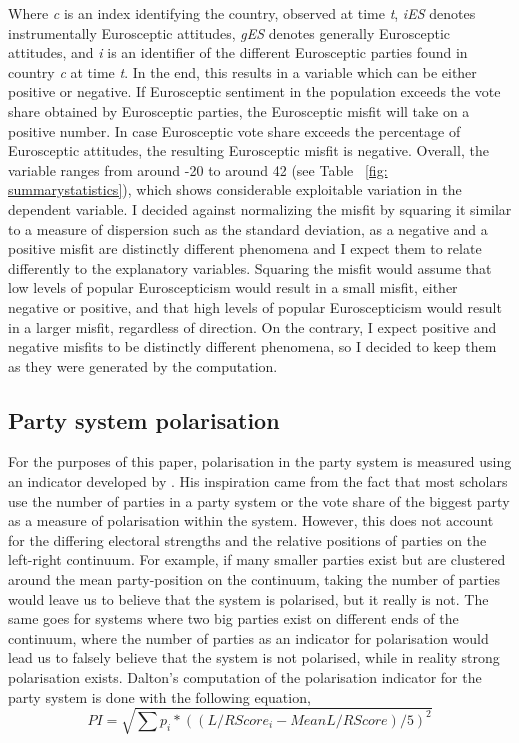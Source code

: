 Where \emph{c} is an index identifying the country, observed at time \emph{t}, \emph{iES} denotes instrumentally Eurosceptic attitudes, \emph{gES} denotes generally Eurosceptic attitudes, and \emph{i} is an identifier of the different Eurosceptic parties found in country \emph{c} at time \emph{t}. In the end, this results in a variable which can be either positive or negative. If Eurosceptic sentiment in the population exceeds the vote share obtained by Eurosceptic parties, the Eurosceptic misfit will take on a positive number. In case Eurosceptic vote share exceeds the percentage of Eurosceptic attitudes, the resulting Eurosceptic misfit is negative. Overall, the variable ranges from around -20 to around 42 (see Table ~\ref{fig: summarystatistics}), which shows considerable exploitable variation in the dependent variable. I decided against normalizing the misfit by squaring it similar to a measure of dispersion such as the standard deviation, as a negative and a positive misfit are distinctly different phenomena and I expect them to relate differently to the explanatory variables. Squaring the misfit would assume that low levels of popular Euroscepticism would result in a small misfit, either negative or positive, and that high levels of popular Euroscepticism would result in a larger misfit, regardless of direction. On the contrary, I expect positive and negative misfits to be distinctly different phenomena, so I decided to keep them as they were generated by the computation.

\subsection{Party system polarisation}
For the purposes of this paper, polarisation in the party system is measured using an indicator developed by . His inspiration came from the fact that most scholars use the number of parties in a party system or the vote share of the biggest party as a measure of polarisation within the system. However, this does not account for the differing electoral strengths and the relative positions of parties on the left-right continuum. For example, if many smaller parties exist but are clustered around the mean party-position on the continuum, taking the number of parties would leave us to believe that the system is polarised, but it really is not. The same goes for systems where two big parties exist on different ends of the continuum, where the number of parties as an indicator for polarisation would lead us to falsely believe that the system is not polarised, while in reality strong polarisation exists. Dalton's computation of the polarisation indicator for the party system is done with the following equation,
\begin{equation}
PI=\sqrt{\sum{p_i * ((L/R Score_i - Mean L/R Score) / 5)^2}}
\end{equation}

